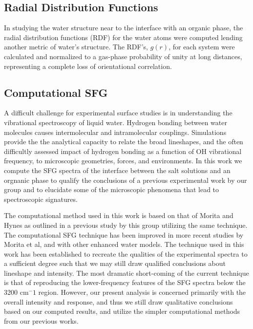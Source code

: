 
\subsection{Radial Distribution Functions}

In studying the water structure near to the interface with an organic phase, the radial distribution functions (RDF) for the water atoms were computed lending another metric of water's structure. The RDF's, $g(r)$, for each system were calculated and normalized to a gas-phase probability of unity at long distances, representing a complete loss of orientational correlation.

\subsection{Computational SFG}
A difficult challenge for experimental surface studies is in understanding the vibrational spectroscopy of liquid water. Hydrogen bonding between water molecules causes intermolecular and intramolecular couplings. Simulations provide the the analytical capacity to relate the broad lineshapes, and the often difficultly assessed impact of hydrogen bonding as a function of OH vibrational frequency, to microscopic geometries, forces, and environments. In this work we compute the SFG spectra of the interface between the salt solutions and an orgnanic phase to qualify the conclusions of a previous experimental work by our group\cite{McFearin2009} and to elucidate some of the microscopic phenomena that lead to spectroscopic signatures.

The computational method used in this work is based on that of Morita and Hynes\cite{Morita2000} as outlined in a previous study by this group utilizing the same technique.\cite{Walker2007} The computational SFG technique has been improved in more recent studies by Morita et al,\cite{Morita2002,Ishiyama2009} and with other enhanced water models. The technique used in this work has been established to recreate the qualities of the experimental spectra to a sufficient degree such that we may still draw qualified conclusions about lineshape and intensity. The most dramatic short-coming of the current technique is that of reproducing the lower-frequency features of the SFG spectra below the 3200 cm$^-1$ region. However, our present analysis is concerned primarily with the overall intensity and response, and thus we still draw qualitative conclusions based on our computed results, and utilize the simpler computational methods from our previous works.
